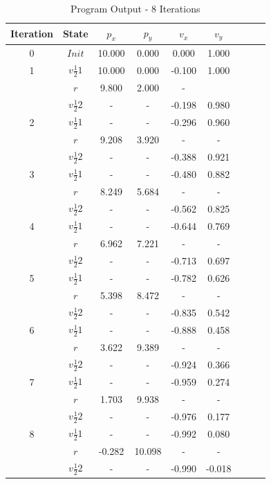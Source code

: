 \begin{table}[H]
\footnotesize
\centering
\caption{Program Output - 8 Iterations}
\def\arraystretch{1.5}
\begin{tabular}{|c|c|c|c|c|c|c|c|c|} \hline
Iteration & State    &   $p_x$ &  $p_y$ &  $v_x$ &  $v_y$ \\ \hline
0 & $Init$           &  10.000 &	0.000 &	 0.000 &	1.000 \\ \hline
1 & $v\frac{1}{2}1$	 &  10.000 &  0.000 &	-0.100 &	1.000 \\ \hline
  & $r$	             &   9.800 &	2.000	&  -     & 		    \\ \hline
  & $v\frac{1}{2}2$	 &   -     &	-     &	-0.198 &	0.980 \\ \hline
2 & $v\frac{1}{2}1$	 &   -     &	-     &	-0.296 &	0.960 \\ \hline
  & $r$	             &   9.208 &	3.920 &	 -     &	-    	\\ \hline
  & $v\frac{1}{2}2$  &	 -     &	-     &	-0.388 &	0.921 \\ \hline
3 & $v\frac{1}{2}1$  &	 -     &	-    	& -0.480 &	0.882 \\ \hline
  & $r$              & 	 8.249 &	5.684	&  -     &	-     \\ \hline
  & $v\frac{1}{2}2$  &	 -     &	-    	& -0.562 &	0.825	\\ \hline
4 & $v\frac{1}{2}1$  &	 -     &	-    	& -0.644 &	0.769	\\ \hline
  & $r$	             &   6.962 &	7.221	&  -     &	-    	\\ \hline
  & $v\frac{1}{2}2$  &	 -     &	-     &	-0.713 &	0.697 \\ \hline
5 & $v\frac{1}{2}1$  &	 -     &	-     &	-0.782 &	0.626 \\ \hline
  & $r$	             &   5.398 &	8.472	&  -     &	-    	\\ \hline
  & $v\frac{1}{2}2$  &	 -     &	-    	& -0.835 &	0.542	\\ \hline
6 & $v\frac{1}{2}1$	 &   -     &	-    	& -0.888 &	0.458	\\ \hline
  & $r$	             &   3.622 &	9.389	&  -     &	-    	\\ \hline
  & $v\frac{1}{2}2$  &	 -     & 	-    	& -0.924 &	0.366	\\ \hline
7 & $v\frac{1}{2}1$  &	 -     &	-    	& -0.959 &	0.274	\\ \hline
  & $r$	             &   1.703 &	9.938	&  -     &	-    	\\ \hline
  & $v\frac{1}{2}2$  &	 -     &	-    	& -0.976 &	0.177	\\ \hline
8 & $v\frac{1}{2}1$  &	 -     &	-    	& -0.992 &	0.080	\\ \hline
  & $r$	             &  -0.282 & 10.098	&  -     &	-    	\\ \hline
  & $v\frac{1}{2}2$  &	 -     &  -    	& -0.990 & -0.018	\\ \hline
\end{tabular}
\vspace{-40pt}
\end{table}

